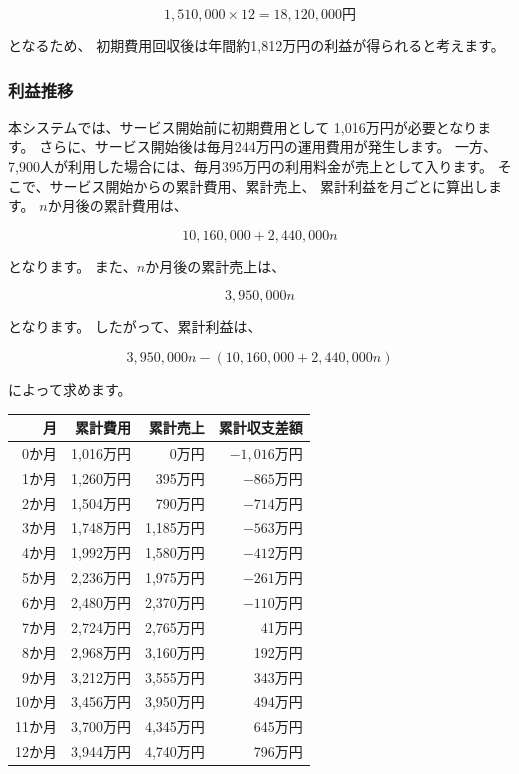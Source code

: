 \documentclass[uplatex,dvipdfmx]{jlreq}
\begin{document}
\[
1,510,000 \times12 = 18,120,000\text{円} 
\]

となるため、 初期費用回収後は年間約1,812万円の利益が得られると考えます。 

\subsubsection{利益推移} 
本システムでは、サービス開始前に初期費用として 1,016万円が必要となります。
さらに、サービス開始後は毎月244万円の運用費用が発生します。
 一方、7,900人が利用した場合には、毎月395万円の利用料金が売上として入ります。
そこで、サービス開始からの累計費用、累計売上、 累計利益を月ごとに算出します。
$n$か月後の累計費用は、 

\[
10,160,000 + 2,440,000n
\]

となります。
 また、$n$か月後の累計売上は、 

\[
3,950,000n
\]

となります。 
したがって、累計利益は、 

\[
3,950,000n - (10,160,000 + 2,440,000n)
\]

によって求めます。 

\begin{center}
\begin{tabular}{rrrr} \hline
月 & 累計費用 & 累計売上 & 累計収支差額 \\ \hline
0か月  & 1,016万円 & 0万円     & $-1,016$万円 \\
1か月  & 1,260万円 & 395万円   & $-865$万円 \\
2か月  & 1,504万円 & 790万円   & $-714$万円 \\
3か月  & 1,748万円 & 1,185万円 & $-563$万円 \\
4か月  & 1,992万円 & 1,580万円 & $-412$万円 \\
5か月  & 2,236万円 & 1,975万円 & $-261$万円 \\
6か月  & 2,480万円 & 2,370万円 & $-110$万円 \\
7か月  & 2,724万円 & 2,765万円 & 41万円 \\
8か月  & 2,968万円 & 3,160万円 & 192万円 \\
9か月  & 3,212万円 & 3,555万円 & 343万円 \\
10か月 & 3,456万円 & 3,950万円 & 494万円 \\
11か月 & 3,700万円 & 4,345万円 & 645万円 \\
12か月 & 3,944万円 & 4,740万円 & 796万円 \\ \hline
\end{tabular}
\end{center}
\end{document}
